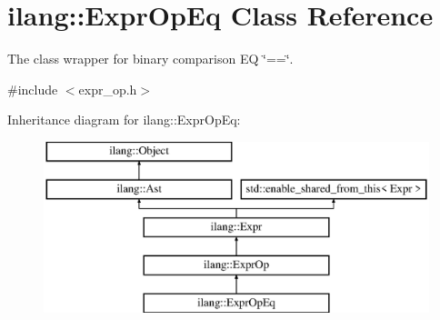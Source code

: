 \hypertarget{classilang_1_1_expr_op_eq}{}\section{ilang\+:\+:Expr\+Op\+Eq Class Reference}
\label{classilang_1_1_expr_op_eq}


The class wrapper for binary comparison EQ \char`\"{}==\char`\"{}.  




{\ttfamily \#include $<$expr\+\_\+op.\+h$>$}

Inheritance diagram for ilang\+:\+:Expr\+Op\+Eq\+:\begin{figure}[H]
\begin{center}
\leavevmode
\includegraphics[height=5.000000cm]{classilang_1_1_expr_op_eq}
\end{center}
\end{figure}
